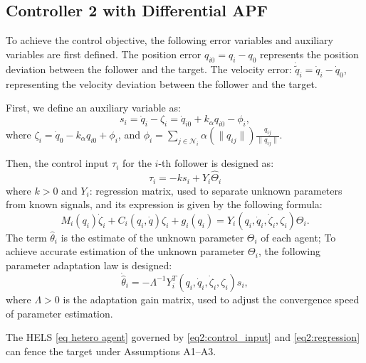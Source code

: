 \subsection{Controller 2 with Differential APF}
\label{sec: controller2}

To achieve the control objective, the following error variables and auxiliary variables are first defined.
The position error \( {q}_{i0} = q_i - q_0 \) represents the position deviation between the follower and the target.
The velocity error: \( \dot{\tilde{q}}_i = \dot{q}_i - \dot{q}_0 \), representing the velocity deviation between the follower and the target.

First, we define an auxiliary variable as:
\begin{equation}\label{eq2:sliding_var}
	s_i = \dot{q}_i - \zeta_i=\dot{q}_{i0}+k_\alpha q_{i0}-\phi_i,
\end{equation}
where $\zeta_i = \dot{q}_0 - k_{\alpha} {q}_{i0} + \phi_i$, and $\phi_i=\sum_{j\in\mathcal{N}_i}\alpha(\|q_{ij}\|)\frac{q_{ij}}{\|q_{ij}\|}$.

Then, the control input \( \tau_i \) for the \( i \)-th follower is designed as:
\begin{equation}\label{eq2:control_input}
	\tau_i = -k s_i + Y_i \hat{\Theta}_i
 \end{equation}
where \( k > 0 \) and \( Y_i \): regression matrix, used to separate unknown parameters from known signals, and its expression is given by the following formula:
	\begin{equation}\label{eq2:regression}
		M_i(q_i)\dot{\zeta}_i + C_i(q_i,\dot{q})\zeta_i + g_i(q_i)=Y_{i}(q_{i},\dot{q}_{i},\dot{\zeta}_i,\zeta_i)\Theta_{i}.
	\end{equation}
The term \( \hat{\theta}_i \) is the estimate of the unknown parameter \( \Theta_i \) of  each agent;
To achieve accurate estimation of the unknown parameter \( \Theta_i \), the following parameter adaptation law is designed:
\begin{equation}\label{eq2:adaptation}
	\dot{\hat{\theta}}_i = -\Lambda^{-1} Y_i^T(q_{i},\dot{q}_{i},\dot{\zeta}_i,\zeta_i) s_i,
\end{equation}
where \( \Lambda > 0 \) is the adaptation gain matrix, used to adjust the convergence speed of parameter estimation.

\begin{theorem}
	The HELS \eqref{eq hetero agent} governed by \eqref{eq2:control_input} and \eqref{eq2:regression} can fence the target under Assumptions A1--A3.
\end{theorem}

